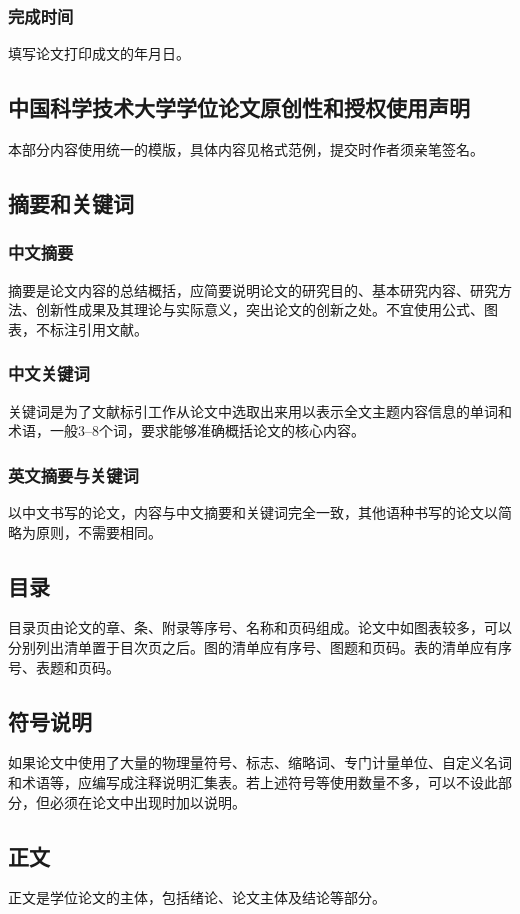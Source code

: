 \subsubsection{完成时间} 填写论文打印成文的年月日。

\subsection{中国科学技术大学学位论文原创性和授权使用声明}
本部分内容使用统一的模版，具体内容见格式范例，提交时作者须亲笔签名。

\subsection{摘要和关键词}
\subsubsection{中文摘要}
摘要是论文内容的总结概括，应简要说明论文的研究目的、基本研究内容、研究方法、创新性成果及其理论与实际意义，突出论文的创新之处。不宜使用公式、图表，不标注引用文献。 
\subsubsection{中文关键词} 
关键词是为了文献标引工作从论文中选取出来用以表示全文主题内容信息的单词和术语，一般3--8个词，要求能够准确概括论文的核心内容。
\subsubsection{英文摘要与关键词}
以中文书写的论文，内容与中文摘要和关键词完全一致，其他语种书写的论文以简略为原则，不需要相同。

\subsection{目录}
目录页由论文的章、条、附录等序号、名称和页码组成。论文中如图表较多，可以分别列出清单置于目次页之后。图的清单应有序号、图题和页码。表的清单应有序号、表题和页码。

\subsection{符号说明}
如果论文中使用了大量的物理量符号、标志、缩略词、专门计量单位、自定义名词和术语等，应编写成注释说明汇集表。若上述符号等使用数量不多，可以不设此部分，但必须在论文中出现时加以说明。

\subsection{正文}
正文是学位论文的主体，包括绪论、论文主体及结论等部分。
